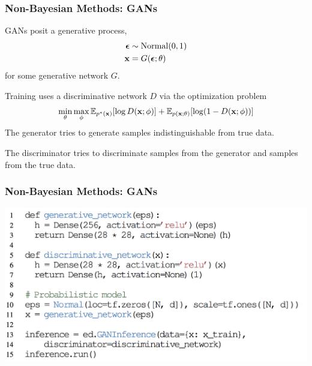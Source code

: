 \documentclass[10pt,
               xcolor={usenames,dvipsnames},
               hyperref={colorlinks,linktoc=all,citecolor=Plum,linkcolor=MidnightBlue,urlcolor=MidnightBlue},noamssymb]{beamer}
\begin{document}
\begin{frame}
\frametitle{Non-Bayesian Methods: GANs}
GANs posit a generative process,
\begin{align*}
\boldsymbol{\mathbf{\epsilon}} &\sim \text{Normal}(0, 1) \\
\boldsymbol{\mathbf{x}} &= G(\boldsymbol{\mathbf{\epsilon}};\theta)
\end{align*}
for some generative network $G$.

Training uses a discriminative network $D$ via the
optimization problem
\begin{equation*}
\min_\theta \max_\phi
\mathbb{E}_{p^*(\boldsymbol{\mathbf{x}})} [ \log D(\boldsymbol{\mathbf{x}}; \phi) ]
+ \mathbb{E}_{p(\boldsymbol{\mathbf{x}}; \theta)} [ \log (1 - D(\boldsymbol{\mathbf{x}}; \phi)) ]
\end{equation*}
The generator tries to generate samples indistinguishable from true data.

The discriminator tries to discriminate samples from the generator and
samples from the true data.

\end{frame}

\begin{frame}
\frametitle{Non-Bayesian Methods: GANs}
\begin{center}
\vspace{-2ex}
\includegraphics[width=1.0\textwidth]{img/gan_example.png}
\end{center}
\end{frame}
\end{document}
